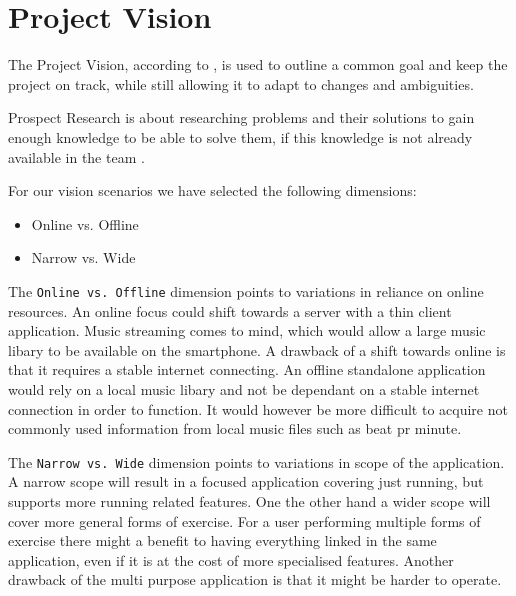 \section{Project Vision}
The Project Vision, according to \citet[ p. 104]{essence}, is used to outline a common goal and keep the project on track, while still allowing it to adapt to changes and ambiguities.

Prospect Research is about researching problems and their solutions to gain enough knowledge to be able to solve them, if this knowledge is not already available in the team \citep[ pp. 104-105]{essence}.

For our vision scenarios \cite[ p. 127]{essence} we have selected the following dimensions:
\begin{itemize}
\item Online vs. Offline %
\item Narrow vs. Wide
\end{itemize}

The \texttt{Online vs. Offline} dimension points to variations in reliance on online resources. An online focus could shift  towards a server with a thin client application. Music streaming comes to mind, which would allow a large music libary to be available on the smartphone. A drawback of a shift towards online is that it requires a stable internet connecting. An offline standalone application would rely on a local music libary and not be dependant on a stable internet connection in order to function. It would however be more difficult to acquire not commonly used information from local music files such as beat pr minute.


The \texttt{Narrow vs. Wide} dimension points to variations in scope of the application. A narrow scope will result in a focused application covering just running, but supports more running related features. One the other hand a wider scope will cover more general forms of exercise. For a user performing multiple forms of exercise there might a benefit to having everything linked in the same application, even if it is at the cost of more specialised features. Another drawback of the multi purpose application is that it might be harder to operate.


